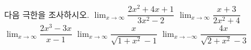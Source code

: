 다음 극한을 조사하시오.
 $\displaystyle\lim_{x\to\infty}\dfrac{2x^2+4x+1}{3x^2-2}$
 $\displaystyle\lim_{x\to\infty}\dfrac{x+3}{2x^2+4}$
 $\displaystyle\lim_{x\to\infty}\dfrac{2x^3-3x}{x-1}$
 $\displaystyle\lim_{x\to\infty}\dfrac{x}{\sqrt{1+x^2}-1}$
 $\displaystyle\lim_{x\to -\infty}\dfrac{4x}{\sqrt{2+x^2}-3}$

